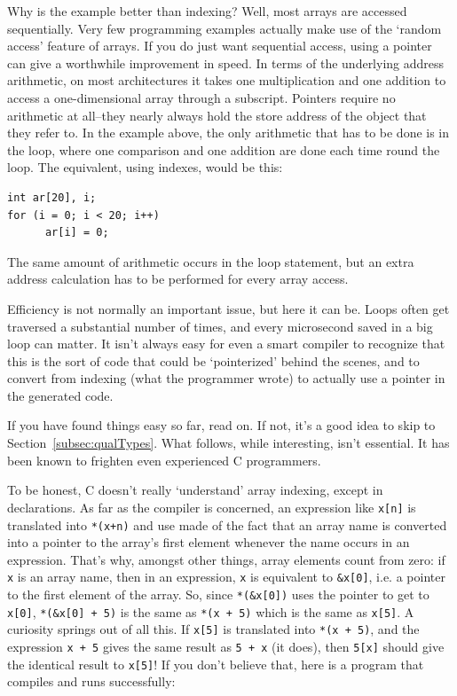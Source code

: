    Why is the example better than indexing? Well, most arrays are
    accessed sequentially. Very few programming examples actually make use
    of the `random access' feature of arrays. If you do just want
    sequential access, using a pointer can give a worthwhile improvement in
    speed. In terms of the underlying address arithmetic, on most
    architectures it takes one multiplication and one addition to access
    a one-dimensional array through a subscript. Pointers require no
    arithmetic at all--they nearly always hold the store address of the
    object that they refer to. In the example above, the only arithmetic
    that has to be done is in the \for{} loop, where one
    comparison and one addition are done each time round the loop. The
    equivalent, using indexes, would be this:


   \begin{Verbatim}
int ar[20], i;
for (i = 0; i < 20; i++)
      ar[i] = 0;
\end{Verbatim}

   The same amount of arithmetic occurs in the loop statement, but an
    extra address calculation has to be performed for every array
    access.


   Efficiency is not normally an important issue, but here it can be.
    Loops often get traversed a substantial number of times, and every
    microsecond saved in a big loop can matter. It isn't always easy for
    even a smart compiler to recognize that this is the sort of code that
    could be `pointerized' behind the scenes, and to convert from
    indexing (what the programmer wrote) to actually use a pointer in the
    generated code.


   If you have found things easy so far, read on. If not, it's a good
    idea to skip to Section~\ref{subsec:qualTypes}. What follows, while
    interesting, isn't essential. It has been known to frighten even
    experienced C programmers.


   To be honest, C doesn't really `understand' array indexing,
    except in declarations. As far as the compiler is concerned, an
    expression like \texttt{x[n]} is translated into \texttt{*(x+n)}
    and use made of the fact that an array name is converted into a pointer
    to the array's first element whenever the name occurs in an expression.
    That's why, amongst other things, array elements count from zero: if
    \texttt{x} is an array name, then in an expression, \texttt{x}
    is equivalent to \texttt{\&x[0]}, i.e. a pointer to the first
    element of the array. So, since \texttt{*(\&x[0])} uses the
    pointer to get to \texttt{x[0]}, \texttt{*(\&x[0] + 5)} is
    the same as \texttt{*(x + 5)} which is the same as
    \texttt{x[5]}. A curiosity springs out of all this. If
    \texttt{x[5]} is translated into \texttt{*(x + 5)}, and the
    expression \texttt{x + 5} gives the same result as \texttt{5
    + x} (it does), then \texttt{5[x]} should give the identical
    result to \texttt{x[5]}! If you don't believe that, here is
    a program that compiles and runs successfully:


